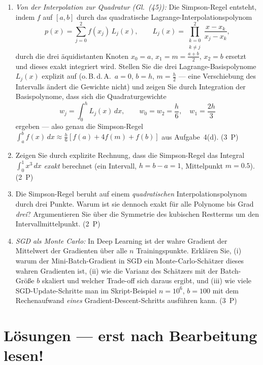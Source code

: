 \documentclass[a4paper,11pt]{scrartcl}
\begin{document}
\begin{enumerate}[label=(\alph*)]
  \item \emph{Von der Interpolation zur Quadratur (Gl.~(45)):} Die Simpson-Regel entsteht, indem $f$ auf $[a, b]$ durch das quadratische Lagrange-Interpolationspolynom
  \[ p(x) = \sum_{j=0}^{2} f(x_j)\,L_j(x), \qquad L_j(x) = \prod_{\substack{k=0 \\ k \neq j}}^{2} \frac{x - x_k}{x_j - x_k}, \]
  durch die drei äquidistanten Knoten $x_0 = a$, $x_1 = m = \frac{a+b}{2}$, $x_2 = b$ ersetzt und dieses exakt integriert wird. Stellen Sie die drei Lagrange-Basispolynome $L_j(x)$ explizit auf (o.\,B.\,d.\,A.\ $a = 0$, $b = h$, $m = \frac{h}{2}$ --- eine Verschiebung des Intervalls ändert die Gewichte nicht) und zeigen Sie durch Integration der Basispolynome, dass sich die Quadraturgewichte
  \[ w_j = \int_0^h L_j(x)\,dx, \qquad w_0 = w_2 = \frac{h}{6}, \quad w_1 = \frac{2h}{3} \]
  ergeben --- also genau die Simpson-Regel $\int_a^b f(x)\,dx \approx \frac{h}{6}\left[f(a) + 4f(m) + f(b)\right]$ aus Aufgabe~4(d). \hfill (3~P)
  \item Zeigen Sie durch explizite Rechnung, dass die Simpson-Regel das Integral $\int_0^1 x^3\,dx$ \emph{exakt} berechnet (ein Intervall, $h = b - a = 1$, Mittelpunkt $m = 0.5$). \hfill (2~P)
  \item Die Simpson-Regel beruht auf einem \emph{quadratischen} Interpolationspolynom durch drei Punkte. Warum ist sie dennoch exakt für alle Polynome bis Grad \emph{drei}? Argumentieren Sie über die Symmetrie des kubischen Restterms um den Intervallmittelpunkt. \hfill (2~P)
  \item \emph{SGD als Monte Carlo:} In Deep Learning ist der wahre Gradient der Mittelwert der Gradienten über alle $n$ Trainingspunkte. Erklären Sie, (i) warum der Mini-Batch-Gradient in SGD ein Monte-Carlo-Schätzer dieses wahren Gradienten ist, (ii) wie die Varianz des Schätzers mit der Batch-Größe $b$ skaliert und welcher Trade-off sich daraus ergibt, und (iii) wie viele SGD-Update-Schritte man im Skript-Beispiel $n = 10^6$, $b = 100$ mit dem Rechenaufwand \emph{eines} Gradient-Descent-Schritts ausführen kann. \hfill (3~P)
\end{enumerate}

\schreibraum[13]
\newpage

\section*{Lösungen --- erst nach Bearbeitung lesen!}
\end{document}
